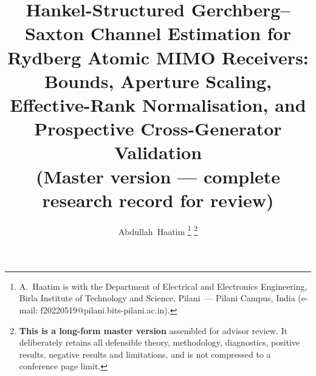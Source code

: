 \documentclass[journal]{IEEEtran}
\begin{document}
\title{Hankel-Structured Gerchberg--Saxton Channel Estimation for Rydberg
Atomic MIMO Receivers: Bounds, Aperture Scaling, Effective-Rank Normalisation,
and Prospective Cross-Generator Validation\\
\large\textnormal{(Master version --- complete research record for review)}}

\author{Abdullah~Haatim%
\thanks{A.~Haatim is with the Department of Electrical and Electronics
Engineering, Birla Institute of Technology and Science, Pilani~--- Pilani
Campus, India (e-mail: f20220519@pilani.bits-pilani.ac.in).}%
\thanks{\textbf{This is a long-form master version} assembled for advisor
review. It deliberately retains all defensible theory, methodology,
diagnostics, positive results, negative results and limitations, and is not
compressed to a conference page limit.}}

\maketitle
\end{document}
